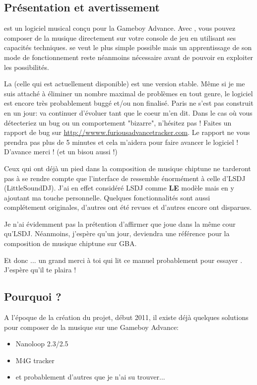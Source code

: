 \subsection{Présentation et avertissement}
\FAT est un logiciel musical conçu pour la Gameboy Advance.
Avec \FAT, vous pouvez composer de la musique directement sur votre console de jeu en utilisant ses capacités techniques.
\FAT se veut le plus simple possible mais un apprentissage de son mode de fonctionnement reste néanmoins nécessaire avant de pouvoir en exploiter les possibilités.\medskip

La \fatversion  (celle qui est actuellement disponible) est une version stable.
Même si je me suis attaché à éliminer un nombre maximal de problèmes en tout genre, le logiciel est encore très probablement buggé et/ou non finalisé.
Paris ne s'est pas construit en un jour: \FAT va continuer d'évoluer tant que le coeur m'en dit.
Dans le cas où vous détecteriez un bug ou un comportement "bizarre", n'hésitez pas !
Faites un rapport de bug sur \url{http://wwww.furiousadvancetracker.com}.
Le rapport ne vous prendra pas plus de 5 minutes et cela m'aidera pour faire avancer le logiciel !
D'avance merci ! (et un bisou aussi !)
\medskip

Ceux qui ont déjà un pied dans la composition de musique chiptune ne tarderont pas à se rendre compte que l'interface de \FAT ressemble énormément à celle d'LSDJ (LittleSoundDJ).
J'ai en effet considéré LSDJ comme {\bf LE} modèle mais en y ajoutant ma touche personnelle.
Quelques fonctionnalités sont aussi complétement originales, d'autres ont été revues et d'autres encore ont disparues.
\medskip

Je n'ai évidemment pas la prétention d'affirmer que \FAT joue dans la même cour qu'LSDJ.
Néanmoins, j'espère qu'un jour, \FAT deviendra une référence pour la composition de musique chiptune sur GBA.\medskip

Et donc ... un grand merci à toi qui lit ce manuel probablement pour essayer \FAT. J'espère qu'il te plaira !

\subsection{Pourquoi \FAT ?}
A l'époque de la création du projet, début 2011, il existe déjà quelques solutions pour composer de la musique sur une Gameboy Advance:
\medskip

\begin{itemize}
  \item{Nanoloop 2.3/2.5}
  \item{M4G tracker}
  \item{et probablement d'autres que je n'ai su trouver...}
\end{itemize}\medskip

